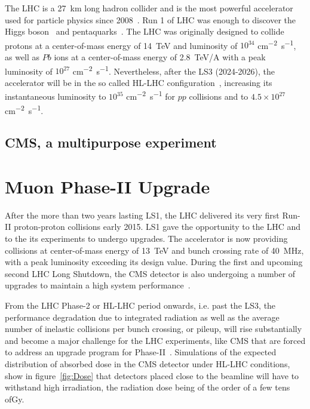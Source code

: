 	The LHC is a \SI{27}{km} long hadron collider and is the most powerful accelerator used for particle physics since 2008~\cite{LHC2008}. Run 1 of LHC was enough to discover the Higgs boson~\cite{HIGGS2015} and pentaquarks~\cite{PENTAQUARK2015}. The LHC was originally designed to collide protons at a center-of-mass energy of \SI{14}{TeV} and luminosity of $10^{34}$ \si{cm^{-2}s^{-1}}, as well as $Pb$ ions at a center-of-mass energy of \SI{2.8}{TeV/A} with a peak luminosity of $10^{27}$ \si{cm^{-2}s^{-1}}. Nevertheless, after the \acf{LS3} (2024-2026), the accelerator will be in the so called \acf{HL-LHC} configuration~\cite{HLLHC2017}, increasing its instantaneous luminosity to $10^{35}$ \si{cm^{-2}s^{-1}} for $pp$ collisions and to $4.5\times 10^{27}$ \si{cm^{-2}s^{-1}}.

	\subsection{CMS, a multipurpose experiment}
	\label{chapt2:ssec:CMS}

\section{Muon Phase-II Upgrade}
\label{chapt2:sec:phase-2}

After the more than two years lasting \acf{LS1}, the \acf{LHC} delivered its very first Run-II proton-proton collisions early 2015. LS1 gave the opportunity to the LHC and to the its experiments to undergo upgrades. The accelerator is now providing collisions at center-of-mass energy of \SI{13}{TeV} and bunch crossing rate of \SI{40}{MHz}, with a peak luminosity exceeding its design value. During the first and upcoming second LHC Long Shutdown, the \acf{CMS} detector is also undergoing a number of upgrades to maintain a high system performance~\cite{MUONTDR}.

From the LHC Phase-2 or \acf{HL-LHC} period onwards, i.e. past the \acf{LS3}, the performance degradation due to integrated radiation as well as the average number of inelastic collisions per bunch crossing, or pileup, will rise substantially and become a major challenge for the LHC experiments, like CMS that are forced to address an upgrade program for Phase-II~\cite{PHASEIITP}. Simulations of the expected distribution of absorbed dose in the CMS detector under HL-LHC conditions, show in figure~\ref{fig:Dose} that detectors placed close to the beamline will have to withstand high irradiation, the radiation dose being of the order of a few tens of\si{Gy}.

